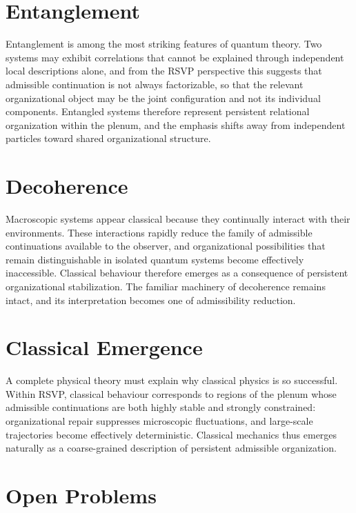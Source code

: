 \documentclass[11pt,oneside]{book}
\numberwithin{equation}{chapter}
\theoremstyle{definition}
\theoremstyle{plain}
\begin{document}
\section{Entanglement}

Entanglement is among the most striking features of quantum theory. Two systems may exhibit correlations that cannot be explained through independent local descriptions alone, and from the RSVP perspective this suggests that admissible continuation is not always factorizable, so that the relevant organizational object may be the joint configuration and not its individual components. Entangled systems therefore represent persistent relational organization within the plenum, and the emphasis shifts away from independent particles toward shared organizational structure.

\section{Decoherence}

Macroscopic systems appear classical because they continually interact with their environments. These interactions rapidly reduce the family of admissible continuations available to the observer, and organizational possibilities that remain distinguishable in isolated quantum systems become effectively inaccessible. Classical behaviour therefore emerges as a consequence of persistent organizational stabilization. The familiar machinery of decoherence remains intact, and its interpretation becomes one of admissibility reduction.

\section{Classical Emergence}

A complete physical theory must explain why classical physics is so successful. Within RSVP, classical behaviour corresponds to regions of the plenum whose admissible continuations are both highly stable and strongly constrained: organizational repair suppresses microscopic fluctuations, and large-scale trajectories become effectively deterministic. Classical mechanics thus emerges naturally as a coarse-grained description of persistent admissible organization.

\section{Open Problems}
\end{document}
